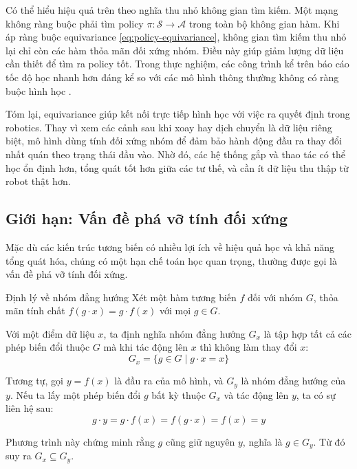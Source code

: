 Có thể hiểu hiệu quả trên theo nghĩa thu nhỏ không gian tìm kiếm. Một mạng không ràng buộc phải tìm policy $\pi: \mathcal{S} \to \mathcal{A}$ trong toàn bộ không gian hàm. Khi áp ràng buộc equivariance \eqref{eq:policy-equivariance}, không gian tìm kiếm thu nhỏ lại chỉ còn các hàm thỏa mãn đối xứng nhóm. Điều này giúp giảm lượng dữ liệu cần thiết để tìm ra policy tốt. Trong thực nghiệm, các công trình kể trên báo cáo tốc độ học nhanh hơn đáng kể so với các mô hình thông thường không có ràng buộc hình học \cite{wang2021equivariant, wang2022so2, zhu2023robot}.

Tóm lại, equivariance giúp kết nối trực tiếp hình học với việc ra quyết định trong robotics. Thay vì xem các cảnh sau khi xoay hay dịch chuyển là dữ liệu riêng biệt, mô hình dùng tính đối xứng nhóm để đảm bảo hành động đầu ra thay đổi nhất quán theo trạng thái đầu vào. Nhờ đó, các hệ thống gắp và thao tác có thể học ổn định hơn, tổng quát tốt hơn giữa các tư thế, và cần ít dữ liệu thu thập từ robot thật hơn.

\subsection{Giới hạn: Vấn đề phá vỡ tính đối xứng}
\label{subsec:symmetry-breaking}

Mặc dù các kiến trúc tương biến có nhiều lợi ích về hiệu quả học và khả năng tổng quát hóa, chúng có một hạn chế toán học quan trọng, thường được gọi là vấn đề phá vỡ tính đối xứng.

\begin{infobox}{Định lý về nhóm đẳng hướng}
Xét một hàm tương biến $f$ đối với nhóm $G$, thỏa mãn tính chất $f(g \cdot x) = g \cdot f(x)$ với mọi $g \in G$.

Với một điểm dữ liệu $x$, ta định nghĩa nhóm đẳng hướng $G_x$ là tập hợp tất cả các phép biến đổi thuộc $G$ mà khi tác động lên $x$ thì không làm thay đổi $x$:
\begin{equation}
    G_x = \{g \in G \mid g \cdot x = x\}
\end{equation}

Tương tự, gọi $y = f(x)$ là đầu ra của mô hình, và $G_y$ là nhóm đẳng hướng của $y$. Nếu ta lấy một phép biến đổi $g$ bất kỳ thuộc $G_x$ và tác động lên $y$, ta có sự liên hệ sau:
\begin{equation}
    g \cdot y = g \cdot f(x) = f(g \cdot x) = f(x) = y
\end{equation}

Phương trình này chứng minh rằng $g$ cũng giữ nguyên $y$, nghĩa là $g \in G_y$. Từ đó suy ra $G_x \subseteq G_y$.
\end{infobox}

